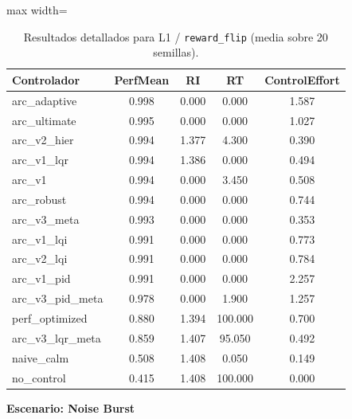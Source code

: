 \documentclass{article}
\newcommand{\scenarioheader}[1]{\Needspace{20\baselineskip}\textbf{Escenario: #1}}
\begin{document}
\begin{table}[H]
\centering
\footnotesize
\caption{Resultados detallados para L1 / \texttt{reward\_flip} (media sobre 20 semillas).}
\label{tab:g1_reward_flip}
\begin{adjustbox}{max width=\textwidth}
\begin{tabular}{@{}lcccc@{}}
\toprule
Controlador & PerfMean & RI & RT & ControlEffort \\ \midrule
arc\_adaptive & 0.998 & 0.000 & 0.000 & 1.587 \\
arc\_ultimate & 0.995 & 0.000 & 0.000 & 1.027 \\
arc\_v2\_hier & 0.994 & 1.377 & 4.300 & 0.390 \\
arc\_v1\_lqr & 0.994 & 1.386 & 0.000 & 0.494 \\
arc\_v1 & 0.994 & 0.000 & 3.450 & 0.508 \\
arc\_robust & 0.994 & 0.000 & 0.000 & 0.744 \\
arc\_v3\_meta & 0.993 & 0.000 & 0.000 & 0.353 \\
arc\_v1\_lqi & 0.991 & 0.000 & 0.000 & 0.773 \\
arc\_v2\_lqi & 0.991 & 0.000 & 0.000 & 0.784 \\
arc\_v1\_pid & 0.991 & 0.000 & 0.000 & 2.257 \\
arc\_v3\_pid\_meta & 0.978 & 0.000 & 1.900 & 1.257 \\
perf\_optimized & 0.880 & 1.394 & 100.000 & 0.700 \\
arc\_v3\_lqr\_meta & 0.859 & 1.407 & 95.050 & 0.492 \\
naive\_calm & 0.508 & 1.408 & 0.050 & 0.149 \\
no\_control & 0.415 & 1.408 & 100.000 & 0.000 \\ \bottomrule
\end{tabular}
\end{adjustbox}
\end{table}

\scenarioheader{Noise Burst}
\end{document}
